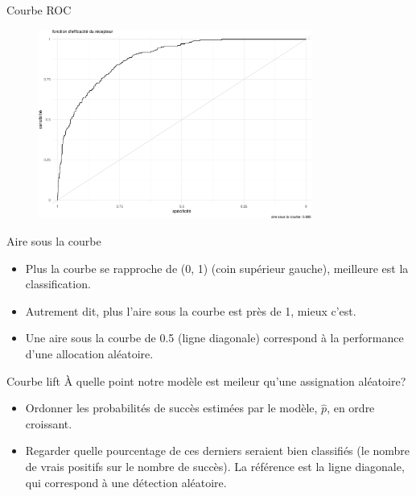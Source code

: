 \documentclass[
  ignorenonframetext,
]{beamer}
\providecommand{\tightlist}{%
  \setlength{\itemsep}{0pt}\setlength{\parskip}{0pt}}\usepackage{longtable,booktabs,array}
\begin{document}
\begin{frame}{Courbe ROC}
\protect\hypertarget{courbe-roc}{}
\begin{figure}

{\centering \includegraphics[width=0.8\textwidth,height=\textheight]{MATH60602-diapos7_files/figure-beamer/unnamed-chunk-9-1.pdf}

}

\end{figure}
\end{frame}

\begin{frame}{Aire sous la courbe}
\protect\hypertarget{aire-sous-la-courbe}{}
\begin{itemize}
\tightlist
\item
  Plus la courbe se rapproche de (0, 1) (coin supérieur gauche),
  meilleure est la classification.
\item
  Autrement dit, plus l'aire sous la courbe est près de 1, mieux c'est.
\item
  Une aire sous la courbe de 0.5 (ligne diagonale) correspond à la
  performance d'une allocation aléatoire.
\end{itemize}
\end{frame}

\begin{frame}{Courbe lift}
\protect\hypertarget{courbe-lift}{}
À quelle point notre modèle est meileur qu'une assignation aléatoire?

\begin{itemize}
\tightlist
\item
  Ordonner les probabilités de succès estimées par le modèle,
  \(\widehat{p}\), en ordre croissant.
\item
  Regarder quelle pourcentage de ces derniers seraient bien classifiés
  (le nombre de vrais positifs sur le nombre de succès). La référence
  est la ligne diagonale, qui correspond à une détection aléatoire.
\end{itemize}
\end{frame}
\end{document}
